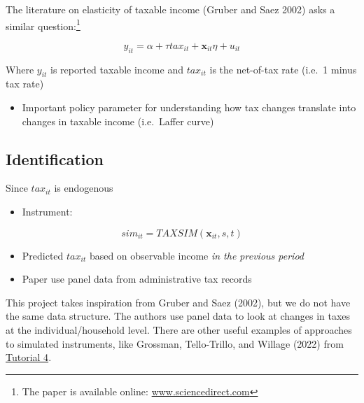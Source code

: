 \documentclass[
  letterpaper,
  DIV=11,
  numbers=noendperiod]{scrartcl}
\providecommand{\tightlist}{%
  \setlength{\itemsep}{0pt}\setlength{\parskip}{0pt}}
\begin{document}
The literature on elasticity of taxable income (Gruber and Saez 2002)
asks a similar question:\footnote{The paper is available online:
  \href{https://www.sciencedirect.com/science/article/pii/S0047272701000858}{www.sciencedirect.com}}

\[
  y_{it} = \alpha + \tau tax_{it} + \mathbf{x}_{it}\eta + u_{it}
\]

Where \(y_{it}\) is reported taxable income and \(tax_{it}\) is the
net-of-tax rate (i.e.~1 minus tax rate)

\begin{itemize}
\tightlist
\item
  Important policy parameter for understanding how tax changes translate
  into changes in taxable income (i.e.~Laffer curve)
\end{itemize}

\subsection{Identification}\label{identification}

Since \(tax_{it}\) is endogenous

\begin{itemize}
\tightlist
\item
  Instrument:
\end{itemize}

\[
  sim_{it} = TAXSIM(\mathbf{x}_{it},s,t)
\]

\begin{itemize}
\item
  Predicted \(tax_{it}\) based on observable income \emph{in the
  previous period}
\item
  Paper use panel data from administrative tax records
\end{itemize}

\begin{tcolorbox}[enhanced jigsaw, colback=white, colframe=quarto-callout-warning-color-frame, breakable, toptitle=1mm, titlerule=0mm, coltitle=black, rightrule=.15mm, opacitybacktitle=0.6, left=2mm, leftrule=.75mm, title=\textcolor{quarto-callout-warning-color}{\faExclamationTriangle}\hspace{0.5em}{Warning}, bottomrule=.15mm, toprule=.15mm, colbacktitle=quarto-callout-warning-color!10!white, bottomtitle=1mm, opacityback=0, arc=.35mm]

This project takes inspiration from Gruber and Saez (2002), but we do
not have the same data structure. The authors use panel data to look at
changes in taxes at the individual/household level. There are other
useful examples of approaches to simulated instruments, like Grossman,
Tello-Trillo, and Willage (2022) from \href{tutorial-4.qmd}{Tutorial 4}.

\end{tcolorbox}
\end{document}
